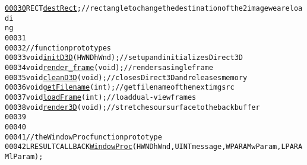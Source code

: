\begin{footnotesize}
\begin{alltt}
\hypertarget{main_8cpp_source_l00030}{}\hyperlink{main_8cpp_a908970643424027cd7df53bf68a9cdad}{00030} RECT \hyperlink{main_8cpp_a908970643424027cd7df53bf68a9cdad}{destRect}; \textcolor{comment}{// rectangle to change the destination of the 2 image we are loadi
      ng}
00031 
00032 \textcolor{comment}{//function prototypes}
00033 \textcolor{keywordtype}{void} \hyperlink{main_8cpp_adc57d8d64e4c467f6818cddd81090db7}{initD3D}(HWND hWnd);\textcolor{comment}{// set up and initializes Direct3D}
00034 \textcolor{keywordtype}{void} \hyperlink{main_8cpp_a9d208c9398ed462c31771146011c45a6}{render_frame}(\textcolor{keywordtype}{void});\textcolor{comment}{// renders a single frame}
00035 \textcolor{keywordtype}{void} \hyperlink{main_8cpp_a6e0493c83a486408dbfaae7812e6e47a}{cleanD3D}(\textcolor{keywordtype}{void});\textcolor{comment}{// closes Direct3D and releases memory}
00036 \textcolor{keywordtype}{void} \hyperlink{main_8cpp_a6deb2598e68338891c9b1faadea263b9}{getFilename}(\textcolor{keywordtype}{int}); \textcolor{comment}{// get filename of the next img src}
00037 \textcolor{keywordtype}{void} \hyperlink{main_8cpp_a117a4ee6ce2172cb8d6b4ac48a6c3645}{loadFrame}(\textcolor{keywordtype}{int}); \textcolor{comment}{// load dual-view frames}
00038 \textcolor{keywordtype}{void} \hyperlink{main_8cpp_a94b4e3bf0d4387b63e1bc86968b6550d}{render3D}(\textcolor{keywordtype}{void}); \textcolor{comment}{// stretches our surface to the backbuffer}
00039 
00040 
00041 \textcolor{comment}{// the WindowProc function prototype}
00042 LRESULT CALLBACK \hyperlink{main_8cpp_a3481ed5b54326a7e5b2562195ee71a58}{WindowProc}(HWND hWnd, UINT message,WPARAM wParam,LPARAM lParam);
      

\end{alltt}
\end{footnotesize}
